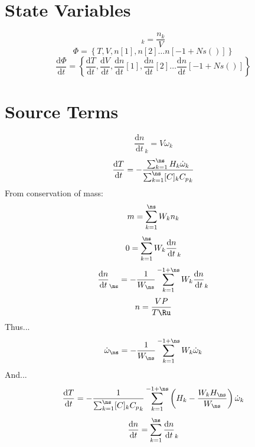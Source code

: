 \documentclass[a4paper,10pt]{article}
\begin{document}
\section{State Variables}
\begin{dmath} [C]_{k} = \frac{n_{k}}{V}\end{dmath} 
\begin{dmath} \Phi = \left\{T,V,n[1],n[2]\ldots n[-1 + Ns()]\right\}\end{dmath} 
\begin{dmath} \frac{\text{d} \Phi }{\text{d} t } = \left\{\frac{\text{d} T }{\text{d} t },\frac{\text{d} V }{\text{d} t },\frac{\text{d} n }{\text{d} t }[1],\frac{\text{d} n }{\text{d} t }[2]\ldots \frac{\text{d} n }{\text{d} t }[-1 + Ns()]\right\}\end{dmath} 
\section{Source Terms}
\begin{dmath} \frac{\text{d} n }{\text{d} t }_{k} = V \dot{\omega}_{k}\end{dmath} 
\begin{dmath} \frac{\text{d} T }{\text{d} t } = - \frac{\sum_{k=1}^{\ns} H_{k} \dot{\omega}_{k}}{\sum_{k=1}^{\ns} [C]_{k} {C_p}_{k}}\end{dmath} 
From conservation of mass:
\begin{dmath} m = \sum_{k=1}^{\ns} W_{k} n_{k}\end{dmath} 
\begin{dmath} 0 = \sum_{k=1}^{\ns} W_{k} \frac{\text{d} n }{\text{d} t }_{k}\end{dmath} 
\begin{dmath} \frac{\text{d} n }{\text{d} t }_{\ns} = - \frac{1}{W_{\ns}} \sum_{k=1}^{-1 + \ns} W_{k} \frac{\text{d} n }{\text{d} t }_{k}\end{dmath} 
\begin{dmath} n = \frac{V P}{T \Ru}\end{dmath} 
Thus...\begin{dmath} \dot{\omega}_{\ns} = - \frac{1}{W_{\ns}} \sum_{k=1}^{-1 + \ns} W_{k} \dot{\omega}_{k}\end{dmath} 
And...\begin{dmath} \frac{\text{d} T }{\text{d} t } = - \frac{1}{\sum_{k=1}^{\ns} [C]_{k} {C_p}_{k}} \sum_{k=1}^{-1 + \ns} \left(H_{k} - \frac{W_{k} H_{\ns}}{W_{\ns}}\right) \dot{\omega}_{k}\end{dmath} 
\begin{dmath} \frac{\text{d} n }{\text{d} t } = \sum_{k=1}^{\ns} \frac{\text{d} n }{\text{d} t }_{k}\end{dmath} 
\end{document}
